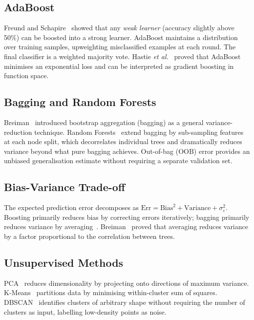 \documentclass[conference]{IEEEtran}
\begin{document}
\subsection{AdaBoost}
Freund and Schapire~\cite{freund1997decision} showed that any
\emph{weak learner} (accuracy slightly above 50\%) can be boosted
into a strong learner.  AdaBoost maintains a distribution over
training samples, upweighting misclassified examples at each round.
The final classifier is a weighted majority vote.  Hastie \emph{et
al.}~\cite{hastie2009elements} proved that AdaBoost minimises an
exponential loss and can be interpreted as gradient boosting in
function space.

\subsection{Bagging and Random Forests}
Breiman~\cite{breiman1996bagging} introduced bootstrap aggregation
(bagging) as a general variance-reduction technique.  Random
Forests~\cite{breiman2001random} extend bagging by sub-sampling
features at each node split, which decorrelates individual trees
and dramatically reduces variance beyond what pure bagging achieves.
Out-of-bag (OOB) error provides an unbiased generalisation estimate
without requiring a separate validation set.

\subsection{Bias-Variance Trade-off}
The expected prediction error decomposes as
$\text{Err} = \text{Bias}^2 + \text{Variance} + \sigma^2_\varepsilon$.
Boosting primarily reduces bias by correcting errors iteratively;
bagging primarily reduces variance by averaging~\cite{hastie2009elements}.
Breiman~\cite{breiman1996bagging} proved that averaging reduces
variance by a factor proportional to the correlation between trees.

\subsection{Unsupervised Methods}
PCA~\cite{pearson1901lines} reduces dimensionality by projecting onto
directions of maximum variance.  K-Means~\cite{lloyd1982least}
partitions data by minimising within-cluster sum of squares.  DBSCAN~\cite{ester1996density}
identifies clusters of arbitrary shape without requiring the number of
clusters as input, labelling low-density points as noise.

\end{document}
